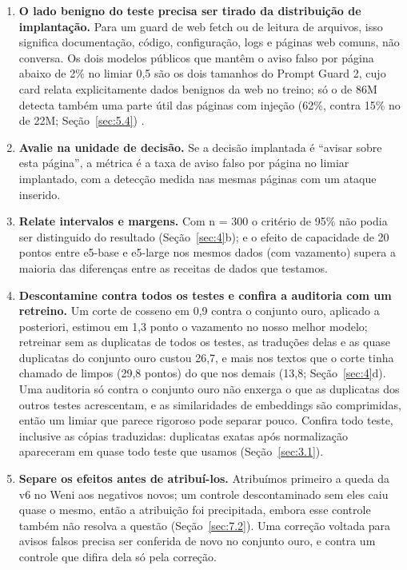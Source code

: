 \documentclass[11pt]{article}
\begin{document}
\begin{enumerate}
\item \textbf{O lado benigno do teste precisa ser tirado da distribuição de implantação.} Para um guard de web fetch ou de leitura de arquivos, isso significa documentação, código, configuração, logs e páginas web comuns, não conversa. Os dois modelos públicos que mantêm o aviso falso por página abaixo de 2\% no limiar 0,5 são os dois tamanhos do Prompt Guard 2, cujo card relata explicitamente dados benignos da web no treino; só o de 86M detecta também uma parte útil das páginas com injeção (62\%, contra 15\% no de 22M; Seção~\ref{sec:5.4})%
.
\item \textbf{Avalie na unidade de decisão.} Se a decisão implantada é ``avisar sobre esta página'', a métrica é a taxa de aviso falso por página no limiar implantado, com a detecção medida nas mesmas páginas com um ataque inserido.
\item \textbf{Relate intervalos e margens.} Com n = 300 o critério de 95\% não podia ser distinguido do resultado (Seção~\ref{sec:4}b); e o efeito de capacidade de 20 pontos entre e5-base e e5-large nos mesmos dados (com vazamento) %
supera a maioria das diferenças entre as receitas de dados que testamos.
\item \textbf{Descontamine contra todos os testes e confira a auditoria com um retreino.} Um corte de cosseno em 0,9 contra o conjunto ouro, aplicado a posteriori, estimou em 1,3 ponto o vazamento no nosso melhor modelo; retreinar sem as duplicatas de todos os testes, as traduções delas e as quase duplicatas do conjunto ouro custou 26,7, e mais nos textos que o corte tinha chamado de limpos (29,8 pontos) do que nos demais (13,8; Seção~\ref{sec:4}d). Uma auditoria só contra o conjunto ouro não enxerga o que as duplicatas dos outros testes acrescentam, e as similaridades de embeddings são comprimidas, então um limiar que parece rigoroso pode separar pouco. Confira todo teste, inclusive as cópias traduzidas: duplicatas exatas após normalização apareceram em quase todo teste que usamos (Seção~\ref{sec:3.1}).
\item \textbf{Separe os efeitos antes de atribuí-los.} Atribuímos primeiro a queda da v6 no Weni aos negativos novos; um controle descontaminado sem eles caiu quase o mesmo, então a atribuição foi precipitada, embora esse controle também não resolva a questão (Seção~\ref{sec:7.2}). Uma correção voltada para avisos falsos precisa ser conferida de novo no conjunto ouro, e contra um controle que difira dela só pela correção.
\end{enumerate}
\end{document}
